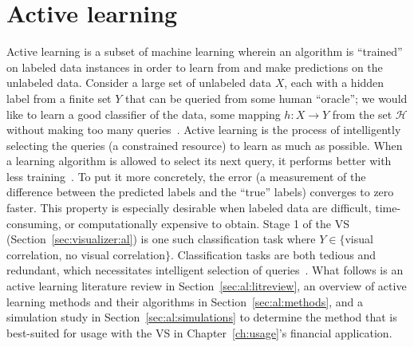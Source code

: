 \chapter{Active learning \label{ch:al}}

Active learning is a subset of machine learning wherein an algorithm is 
``trained'' on labeled data instances in order to learn from and make 
predictions on the unlabeled data.  
Consider a large set of unlabeled data $X$, each with a 
hidden label from a finite set $Y$ that can be queried from some human 
``oracle''; we would like to learn a good classifier of the data, some mapping 
$h: X \rightarrow Y$ from the set $\mathcal{H}$ without making too many 
queries~\cite{dasgupta2011}. Active learning is the process of intelligently 
selecting the queries (a constrained resource) to learn as much as possible. 
When a learning algorithm is allowed to select its next query, it performs 
better with less training~\cite{settles2010}. To put it more concretely, the 
error (a measurement of the difference between the predicted labels and the 
``true'' labels) converges to zero faster. This property is especially 
desirable when labeled data are difficult, time-consuming, or computationally 
expensive to obtain. Stage 1 of the VS (Section~\ref{sec:visualizer:al}) is 
one such classification task where $Y\in\{$visual correlation, no visual 
correlation$\}$. 
Classification tasks are both tedious and redundant, which 
necessitates intelligent selection of queries~\cite{settles2010}. What follows 
is an active learning literature review in Section~\ref{sec:al:litreview}, an 
overview of active learning methods and their algorithms in 
Section~\ref{sec:al:methods}, and a simulation study in 
Section~\ref{sec:al:simulations} to determine the method that is best-suited 
for usage with the VS in Chapter~\ref{ch:usage}'s financial application.




